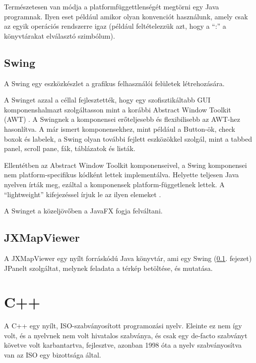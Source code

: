 \documentclass[a4paper,12pt]{report}
\begin{document}
\vspace{2mm}
Természetesen van módja a platformfüggettlenségét megtörni egy Java programnak. Ilyen eset például amikor olyan konvenciót használunk, amely csak az egyik operációs rendszerre igaz (például feltételezzük azt, hogy a ``:'' a könyvtárakat elválasztó szimbólum).

\subsection{Swing}
\label{swing}

A Swing egy eszközkészlet a grafikus felhasználói felületek létrehozására.

\vspace{2mm}
A Swinget azzal a céllal fejlesztették, hogy egy szofisztikáltabb GUI komponenshalmazt szolgáltasson mint a korábbi Abstract Window Toolkit (AWT) \cite{awt}. A Swingnek a komponensei erőteljesebb és flexibilisebb az AWT-hez hasonlítva. A már ismert komponensekhez, mint például a Button-ök, check boxok és labelek, a Swing olyan további fejlett eszközökkel szolgál, mint a tabbed panel, scroll pane, fák, táblázatok és listák.

\vspace{2mm}
Ellentétben az Abstract Window Toolkit komponenseivel, a Swing komponensei nem platform-specifikus kódként lettek implementálva. Helyette teljesen Java nyelven írták meg, ezáltal a komponensek platform-függetlenek lettek. A ``lightweight'' kifejezéssel írjuk le az ilyen elemeket \cite{swingarticle}.

\vspace{2mm}
A Swinget a közeljövőben a JavaFX \cite{javafx} fogja felváltani.

\subsection{JXMapViewer}
\label{jxmapviewer}

A JXMapViewer \cite{jxmapv} egy nyílt forráskódú Java könyvtár, ami egy Swing (\ref{swing}. fejezet) JPanelt \cite{jpanel} szolgáltat, melynek feladata a térkép betöltése, és mutatása.

\newpage
\section{C++}
\label{cplusplus}

A C++ egy nyílt, ISO-szabványosított programozási nyelv. Eleinte ez nem így volt, és a nyelvnek nem volt hivatalos szabványa, és csak egy de-facto szabványt követve volt karbantartva, fejlesztve, azonban 1998 óta \cite{c++98} a nyelv szabványosítva van az ISO egy bizottsága által.
\end{document}

